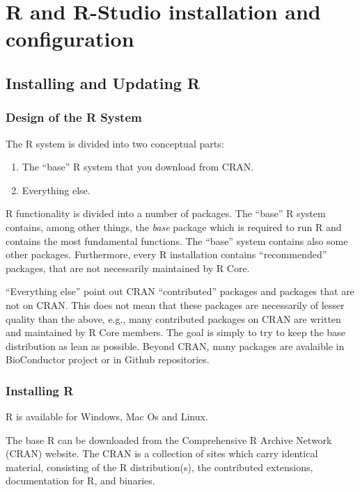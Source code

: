 \documentclass[]{book}
\providecommand{\tightlist}{%
  \setlength{\itemsep}{0pt}\setlength{\parskip}{0pt}}
\def\tightlist{}
\begin{document}
\chapter{R and R-Studio installation and
configuration}\label{r-and-r-studio-installation-and-configuration}

\section{Installing and Updating R}\label{installing-and-updating-r}

\subsection{Design of the R System}\label{design-of-the-r-system}

The R system is divided into two conceptual parts:

\begin{enumerate}
\def\labelenumi{\arabic{enumi}.}
\tightlist
\item
  The ``base'' R system that you download from CRAN.
\item
  Everything else.
\end{enumerate}

R functionality is divided into a number of packages. The ``base'' R
system contains, among other things, the \emph{base} package which is
required to run R and contains the most fundamental functions. The
``base'' system contains also some other packages. Furthermore, every R
installation contains ``recommended'' packages, that are not necessarily
maintained by R Core.

``Everything else'' point out CRAN ``contributed'' packages and packages
that are not on CRAN. This does not mean that these packages are
necessarily of lesser quality than the above, e.g., many contributed
packages on CRAN are written and maintained by R Core members. The goal
is simply to try to keep the base distribution as lean as possible.
Beyond CRAN, many packages are avalaible in BioConductor project or in
Github repositories.

\clearpage

\subsection{Installing R}\label{installing-r}

R is available for Windows, Mac Os and Linux.

The base R can be downloaded from the Comprehensive R Archive Network
(CRAN) website. The CRAN is a collection of sites which carry identical
material, consisting of the R distribution(s), the contributed
extensions, documentation for R, and binaries.
\end{document}
